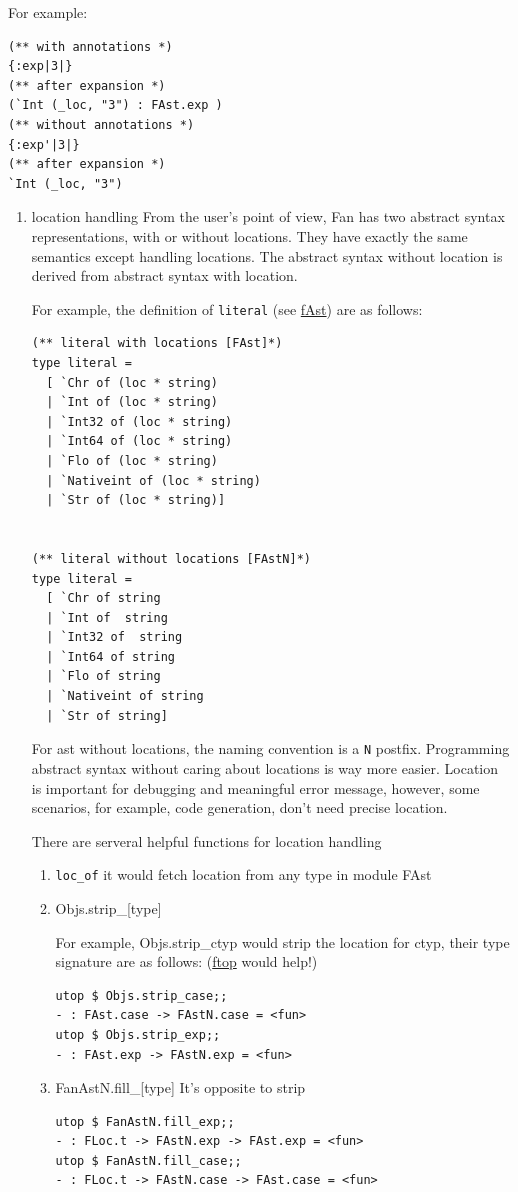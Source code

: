\documentclass[11pt]{article}
\begin{document}
For example:

\begin{verbatim}
(** with annotations *)
{:exp|3|}
(** after expansion *)
(`Int (_loc, "3") : FAst.exp )
(** without annotations *)
{:exp'|3|}
(** after expansion *)
`Int (_loc, "3")
\end{verbatim}

\begin{enumerate}
\item location handling
\label{sec-5-1-2-1}
From the user's point of view, Fan has two
abstract syntax representations, with or without locations. They
have exactly the same semantics except handling locations. The
abstract syntax without location is derived from abstract syntax
with location.

For example, the definition of \verb~literal~ (see \href{fansrc/fAst.mli.html}{fAst}) are as follows:

\begin{verbatim}
(** literal with locations [FAst]*)
type literal =
  [ `Chr of (loc * string)
  | `Int of (loc * string)
  | `Int32 of (loc * string)
  | `Int64 of (loc * string)
  | `Flo of (loc * string)
  | `Nativeint of (loc * string)
  | `Str of (loc * string)]   


(** literal without locations [FAstN]*)
type literal =
  [ `Chr of string
  | `Int of  string
  | `Int32 of  string
  | `Int64 of string
  | `Flo of string
  | `Nativeint of string
  | `Str of string]
\end{verbatim}
For ast without locations, the naming convention is a \verb~N~ postfix.
Programming abstract syntax without caring about locations is way
more easier. Location is important for debugging and meaningful
error message, however, some scenarios, for example, code
generation, don't need precise location.

There are serveral helpful functions for location handling

\begin{enumerate}
\item \verb~loc_of~
it would fetch location from any type in module FAst
\item Objs.strip\_[type]

For example, Objs.strip\_ctyp would strip the location for
ctyp, their type signature are as follows: (\href{https://github.com/bobzhang/ftop}{ftop} would help!)

\begin{verbatim}
utop $ Objs.strip_case;;
- : FAst.case -> FAstN.case = <fun>
utop $ Objs.strip_exp;;
- : FAst.exp -> FAstN.exp = <fun>
\end{verbatim}
\item FanAstN.fill\_[type]
It's opposite to strip
\begin{verbatim}
utop $ FanAstN.fill_exp;;
- : FLoc.t -> FAstN.exp -> FAst.exp = <fun>
utop $ FanAstN.fill_case;;
- : FLoc.t -> FAstN.case -> FAst.case = <fun>
\end{verbatim}
\end{enumerate}


\end{enumerate}
\end{document}
